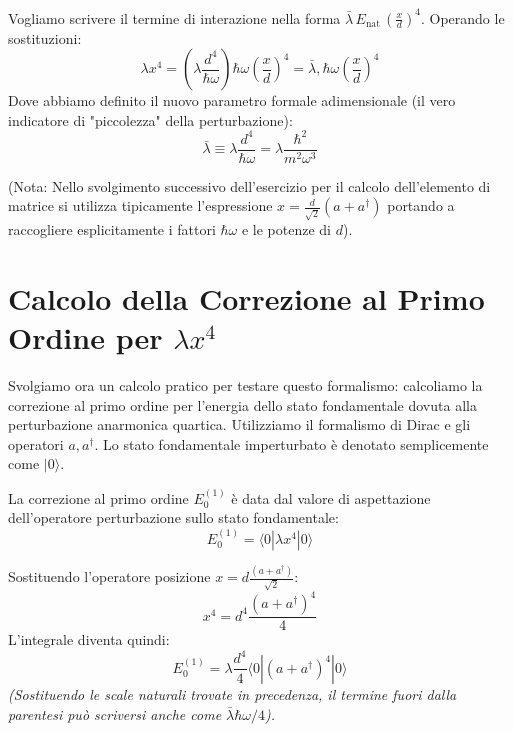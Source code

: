 Vogliamo scrivere il termine di interazione nella forma $\bar{\lambda} \, E_{\text{nat}} \, \left(\frac{x}{d}\right)^4$. Operando le sostituzioni:
\begin{equation}
\lambda x^4 = \left( \lambda \frac{d^4}{\hbar \omega} \right) \hbar \omega \left(\frac{x}{d}\right)^4 = \bar{\lambda} , \hbar \omega \left(\frac{x}{d}\right)^4
\end{equation}
Dove abbiamo definito il nuovo parametro formale adimensionale (il vero indicatore di "piccolezza" della perturbazione):
\begin{equation}
\bar{\lambda} \equiv \lambda \frac{d^4}{\hbar \omega} = \lambda \frac{\hbar^2}{m^2 \omega^3}
\end{equation}

(Nota: Nello svolgimento successivo dell'esercizio per il calcolo dell'elemento di matrice si utilizza tipicamente l'espressione $x = \frac{d}{\sqrt{2}}(a + a^\dagger)$ portando a raccogliere esplicitamente i fattori $\hbar \omega$ e le potenze di $d$).

\section{Calcolo della Correzione al Primo Ordine per $\lambda x^4$}

Svolgiamo ora un calcolo pratico per testare questo formalismo: calcoliamo la correzione al primo ordine per l'energia dello stato fondamentale dovuta alla perturbazione anarmonica quartica.
Utilizziamo il formalismo di Dirac e gli operatori $a, a^\dagger$. Lo stato fondamentale imperturbato è denotato semplicemente come $\vert{}0\rangle$.

La correzione al primo ordine $E_0^{(1)}$ è data dal valore di aspettazione dell'operatore perturbazione sullo stato fondamentale:
\begin{equation}
E_0^{(1)} = \langle 0 | \lambda x^4 | 0 \rangle
\end{equation}

Sostituendo l'operatore posizione $x = d \frac{(a + a^\dagger)}{\sqrt{2}}$:
\begin{equation}
x^4 = d^4 \frac{(a + a^\dagger)^4}{4}
\end{equation}
L'integrale diventa quindi:
\begin{equation}
E_0^{(1)} = \lambda \frac{d^4}{4} \langle 0 | (a + a^\dagger)^4 | 0 \rangle
\end{equation}
\textit{(Sostituendo le scale naturali trovate in precedenza, il termine fuori dalla parentesi può scriversi anche come $\bar{\lambda} \hbar \omega / 4$).}

